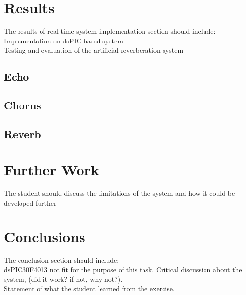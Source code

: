 \documentclass{scrartcl}
\begin{document}
    \section{Results}
    The results of real-time system implementation section should include:\\
        Implementation on dsPIC based system\\
        Testing and evaluation of the artificial reverberation system\\
        \subsection{Echo}
        \subsection{Chorus}
        \subsection{Reverb}
        
    \section{Further Work}
    The student should discuss the limitations of the system and how it could be developed further

    \section{Conclusions}
    The conclusion section should include:\\
    dsPIC30F4013 not fit for the purpose of this task.
        Critical discussion about the system, (did it work? if not, why
        not?).\\
        Statement of what the student learned from the exercise.\\

    \printbibliography
\end{document}
